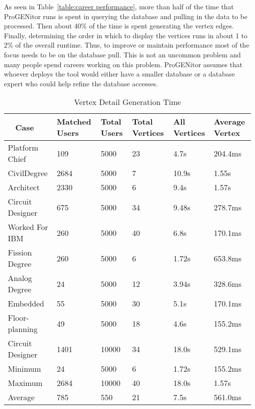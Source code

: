 As seen in Table~\ref{table:career performance}, more than half of the time that
ProGENitor runs is spent in querying the database and pulling in the data to be
processed.  Then about 40\% of the time is spent generating the vertex
edges. Finally, determining the order in which to display the vertices runs
in about 1 to 2\% of the overall runtime.  Thus, to improve or maintain performance most of
the focus needs to be on the database pull.  This is not an uncommon problem and
many people spend careers working on this problem.  ProGENitor assumes that
whoever deploys the tool would either have a smaller database or a database
expert who could help refine the database accesses.

\begin{table}[H]
  \centering
  \begin{tabular}{|p{17mm}|p{16mm}|p{10mm}|p{18mm}|p{19mm}|p{20mm}|}
  \hline
  \
  Case&Matched Users&Total Users&Total Vertices&All Vertices&Average Vertex\\
  \hline\hline
  Platform Chief&109&5000&23&4.7s&204.4ms\\ \hline
  Civil\newline Degree&2684&5000&7&10.9s&1.55s\\ \hline 
  Architect&2330&5000&6&9.4s&1.57s\\ \hline
  Circuit Designer&675&5000&34&9.48s&278.7ms\\ \hline
  Worked For IBM&260&5000&40&6.8s&170.1ms\\ \hline
  Fission Degree&260&5000&6&1.72s&653.8ms\\ \hline
  Analog Degree&24&5000&12&3.94s&328.6ms\\ \hline
  Embedded&55&5000&30&5.1s&170.1ms\\ \hline
  Floor- \newline planning&49&5000&18&4.6s&155.2ms\\ \hline
  Circuit Designer&1401&10000&34&18.0s&529.1ms\\ \hline
  \hline\hline
  Minimum&24&5000&6&1.72s&155.2ms\\ \hline
  Maximum&2684&10000&40&18.0s&1.57s\\ \hline
  Average&785&550&21&7.5s&561.0ms\\ \hline
  \end{tabular}
  \caption{Vertex Detail Generation Time}
  \label{table:node-perf}
\end{table}


